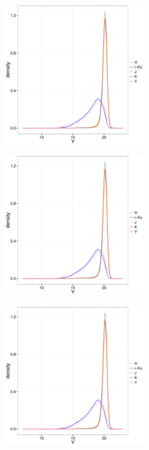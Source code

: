 \begin{figure}[ht!]
    \centering
    \begin{subfigure}[t]{0.45\textwidth}
        \includegraphics[page=1,height=6cm]{background/Figures/MissingDistributionsDDR2.pdf}
    \end{subfigure}
    \begin{subfigure}[t]{0.45\textwidth}
      \includegraphics[page=2,height=6cm]{background/Figures/MissingDistributionsDDR2.pdf}
    \end{subfigure}
     \begin{subfigure}[t]{0.45\textwidth}
      \includegraphics[page=3,height=6cm]{background/Figures/MissingDistributionsDDR2.pdf}
    \end{subfigure}
     \begin{subfigure}[t]{0.45\textwidth}

\end{subfigure}
\end{figure}
